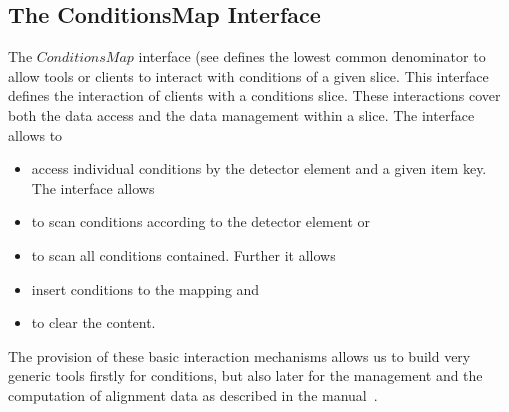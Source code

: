 \documentclass[10pt,a4paper]{article}
\begin{document}
\subsection{The ConditionsMap Interface}
\label{subsec:ddcond-conditionsmap}

\noindent
The $ConditionsMap$ interface (see 
defines the lowest common denominator to
allow tools or clients to interact with conditions of a given slice.
This interface defines the interaction of clients with a conditions slice.
These interactions cover both the data access and the data management 
within a slice. The interface allows to
\begin{itemize}\itemcompact
\item access individual conditions by the detector element
and a given item key. The interface allows
\item to scan conditions according to the detector element or 
\item to scan all conditions contained. Further it allows 
\item insert conditions to the mapping and
\item to clear the content.
\end{itemize}
The provision of these basic interaction mechanisms allows us to build
very generic tools firstly for conditions, but also later for the
management and the computation of alignment data as described in
the \DDA manual~\cite{bib:ddalign-manual}.
\end{document}
